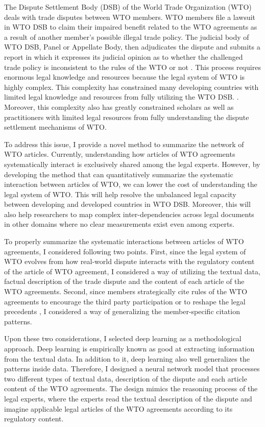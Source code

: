 The Dispute Settlement Body (DSB) of
the World Trade Organization (WTO) deals
with trade disputes between WTO members.
WTO members file a lawsuit in WTO DSB to
claim their impaired benefit related to the WTO agreements as a result of another member's possible illegal trade policy.
The judicial body of WTO DSB, Panel or Appellate Body, then adjudicates the dispute and submits a report in which it expresses
its judicial opinion as to whether the challenged
trade policy is inconsistent to the rules of the WTO or not \citep{world2017handbook}.
This process requires enormous legal knowledge and resources because the legal system of WTO is highly complex.
This complexity has constrained many developing countries with limited legal knowledge and resources from fully utilizing the WTO DSB.
\citep{busch_reinhardt_shaffer_2009, dev_busch, shaffer_2006}.
Moreover, this complexity also has greatly constrained scholars as well as practitioners with limited legal resources from fully understanding the dispute settlement mechanisms of WTO. 



To address this issue, I provide a novel method to summarize the network of WTO articles.
Currently, understanding how articles of WTO agreements systematically interact is exclusively shared among the legal experts.
However, by developing the method that can quantitatively summarize the systematic interaction between articles of WTO,
we can lower the cost of understanding the legal system of WTO. This will help resolve the unbalanced legal capacity between developing and developed countries in WTO DSB.
Moreover, this will also help researchers to map complex inter-dependencies across legal documents in other domains where no clear measurements exist even among experts.

To properly summarize the systematic interactions between articles of WTO agreements, I considered following two points.
First, since the legal system of WTO evolves from how real-world dispute interacts with the regulatory content of the article of WTO agreement,
I considered a way of utilizing the textual data, factual description of the trade dispute and the content of each article of the WTO agreements.
Second, since members strategically cite rules of the WTO agreements to encourage
the third party participation \citep{who_gets} or to reshape the legal precedents \citep{pelc, latent},
I considered a way of generalizing the member-specific citation patterns.

Upon these two considerations, I selected deep learning as a methodological approach.
Deep learning is empirically known as good at extracting information from the textual data.
In addition to it, deep learning also well generalizes the patterns inside data.
Therefore, I designed a neural network model that processes two different types of textual data,
description of the dispute and each article content of the WTO agreements.
The design mimics the reasoning process of the legal experts,
where the experts read
the textual description of the dispute and imagine applicable legal articles of the WTO agreements according to its regulatory content.

